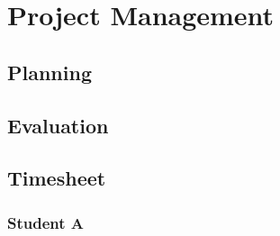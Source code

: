 
\chapter{Project Management}

\section{Planning}

\section{Evaluation}

\section{Timesheet}
\subsection{Student A}
